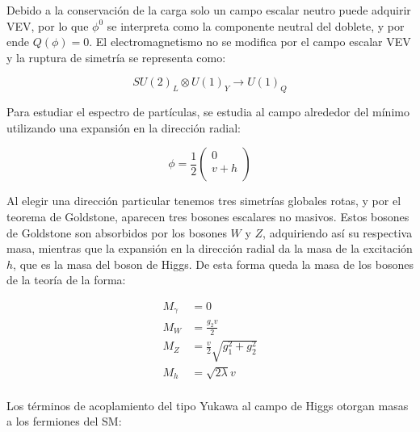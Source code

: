 Debido a la conservación de la carga solo un campo escalar neutro puede adquirir VEV, por lo que $\phi^0$ se interpreta como la componente neutral del doblete, 
y por ende $Q(\phi)=0$. El electromagnetismo no se modifica por el campo escalar VEV y la ruptura de simetría se representa como:

\begin{equation}
SU(2)_L \otimes U(1)_Y \rightarrow U(1)_Q
\end{equation}

Para estudiar el espectro de partículas, se estudia al campo alrededor del mínimo utilizando una expansión en la dirección radial:

\begin{equation}
	\phi = \frac{1}{2}
	\begin{pmatrix}
	0 \\
	v + h \\
	\end{pmatrix}
\end{equation}

Al elegir una dirección particular tenemos tres simetrías globales rotas, y por el teorema de Goldstone, aparecen tres bosones escalares no masivos. Estos bosones de Goldstone son absorbidos por los bosones $W$ y $Z$, adquiriendo así su respectiva masa, 
mientras que la expansión en la dirección radial da la masa de la excitación $h$, que es la masa del boson de Higgs. De esta forma queda la masa de los bosones de la teoría de la forma:

\begin{equation}
\begin{split}
	M_{\gamma} & = 0 \\
	M_{W} & = \frac{g_2 v}{2} \\
	M_{Z} & = \frac{v}{2}\sqrt{g_1^2 + g_2^2} \\
	M_{h} & = \sqrt{2\lambda}v \\
\end{split}
\end{equation}

Los términos de acoplamiento del tipo Yukawa al campo de Higgs otorgan masas a los fermiones del SM:

